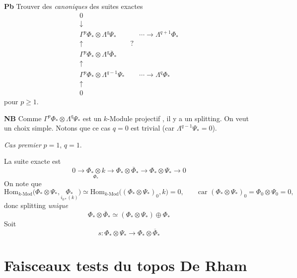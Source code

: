 \documentclass[11pt,a4paper]{article}
\begin{document}
\textbf{Pb} Trouver des  \emph{canoniques} des suites exactes
\[
  \begin{array}{ccc}
    0 & & \\
    \downarrow & & \\
    \Gamma^p \Phi_* \otimes \Lambda^q \Psi_* & & \cdots \to \Lambda^{q+1} \Phi_* \\
    \uparrow & \text{?} & \\
    \Gamma^p \Phi_* \otimes \Lambda^q \overline{\Phi}_* & & \\
    \uparrow & & \\
    \Gamma^p \Phi_* \otimes \Lambda^{q-1} \Psi_* & & \cdots \to \Lambda^q \Phi_* \\
    \uparrow & & \\
    0 & &
  \end{array}
\]
pour $p \geq 1$.

\textbf{NB} Comme $\Gamma^p \Phi_* \otimes \Lambda^q \Psi_*$ est un $k$-Module projectif
, il y a un splitting. On veut un choix simple. Notons que ce cas $q = 0$
est trivial (car $\Lambda^{q-1} \Psi_* = 0$).

\emph{Cas premier} $p = 1$, $q = 1$.

La suite exacte est
\[
  0 \to \underset{\textstyle \Phi_*}{\Phi_* \otimes k} \longrightarrow
  \Phi_* \otimes \overline{\Phi}_* \longrightarrow \Phi_* \otimes \Psi_* \to 0
\]
On note que
\[
  \mathrm{Hom}_{k\text{-Mod}}\bigl(\Phi_* \otimes \Psi_*, \underset{\textstyle i_{0*}(k)}{\Phi_*}\bigr)
  \simeq \mathrm{Hom}_{k\text{-Mod}}\bigl((\Phi_* \otimes \Psi_*)_0, k\bigr) = 0,
  \qquad \text{car } (\Phi_* \otimes \Psi_*)_0 = \Phi_0 \otimes \Psi_0 = 0,
\]
donc splitting \emph{unique}
\[
  \Phi_* \otimes \overline{\Phi}_* \simeq (\Phi_* \otimes \Psi_*) \oplus \Phi_*
\]
Soit \struck{\ill{}}
\[
  s : \Phi_* \otimes \Psi_* \longrightarrow \Phi_* \otimes \overline{\Phi}_*
\]

\section{Faisceaux tests du topos De Rham}
\end{document}
